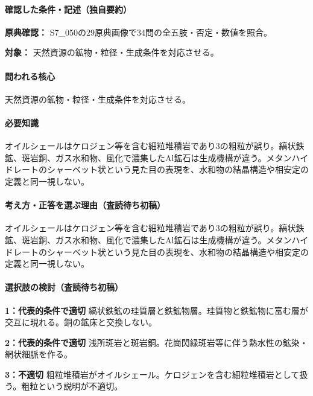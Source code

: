 \paragraph{確認した条件・記述（独自要約）}\mbox{}\par

\noindent\textbf{原典確認：} S7\_050の29原典画像で34問の全五肢・否定・数値を照合。\par

\noindent\textbf{対象：} 天然資源の鉱物・粒径・生成条件を対応させる。\par

\paragraph{問われる核心} 天然資源の鉱物・粒径・生成条件を対応させる。

\paragraph{必要知識} オイルシェールはケロジェン等を含む細粒堆積岩であり3の粗粒が誤り。縞状鉄鉱、斑岩銅、ガス水和物、風化で濃集したAl鉱石は生成機構が違う。メタンハイドレートのシャーベット状という見た目の表現を、水和物の結晶構造や相安定の定義と同一視しない。

\paragraph{考え方・正答を選ぶ理由（査読待ち初稿）} オイルシェールはケロジェン等を含む細粒堆積岩であり3の粗粒が誤り。縞状鉄鉱、斑岩銅、ガス水和物、風化で濃集したAl鉱石は生成機構が違う。メタンハイドレートのシャーベット状という見た目の表現を、水和物の結晶構造や相安定の定義と同一視しない。

\paragraph{選択肢の検討（査読待ち初稿）}\mbox{}\par

\noindent\textbf{1：代表的条件で適切} 縞状鉄鉱の珪質層と鉄鉱物層。珪質物と鉄鉱物に富む層が交互に現れる。銅の鉱床と交換しない。\par

\noindent\textbf{2：代表的条件で適切} 浅所斑岩と斑岩銅。花崗閃緑斑岩等に伴う熱水性の鉱染・網状細脈を作る。\par

\noindent\textbf{3：不適切} 粗粒堆積岩がオイルシェール。ケロジェンを含む細粒堆積岩として扱う。粗粒という説明が不適切。\par

